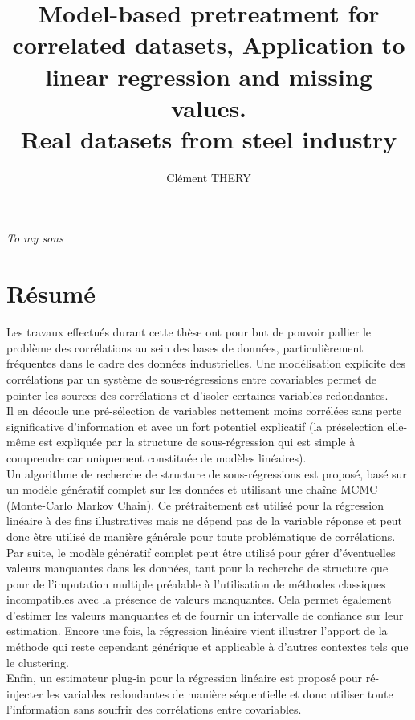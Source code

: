 \documentclass[12pt,a4paper]{report}
\author{Clément THERY}
\title{Model-based pretreatment for correlated datasets, Application to linear regression and missing values. \\ Real datasets from steel industry}
\begin{document}
\maketitle
\newpage
\itshape To my sons
\upshape


\chapter*{Résumé}
	Les travaux effectués durant cette thèse ont pour but de pouvoir pallier le problème des corrélations au sein des bases de données, particulièrement fréquentes dans le cadre des données industrielles. Une modélisation explicite des corrélations par un système de sous-régressions entre covariables permet de pointer les sources des corrélations et d'isoler certaines variables redondantes. 
	\\
	
	Il en découle une pré-sélection de variables nettement moins corrélées sans perte significative d'information et avec un fort potentiel explicatif (la préselection elle-même est expliquée par la structure de sous-régression qui est simple à comprendre car uniquement constituée de modèles linéaires). \\
	
	Un algorithme de recherche de structure de sous-régressions est proposé, basé sur un modèle génératif complet sur les données et utilisant une chaîne MCMC (Monte-Carlo Markov Chain). Ce prétraitement est utilisé pour la régression linéaire à des fins illustratives mais ne dépend pas de la variable réponse et peut donc être utilisé de manière générale pour toute problématique de corrélations.\\
	
	Par suite, le modèle génératif complet peut être utilisé pour gérer d'éventuelles valeurs manquantes dans les données, tant pour la recherche de structure que pour de l'imputation multiple préalable à l'utilisation de méthodes classiques incompatibles avec la présence de valeurs manquantes. Cela permet également d'estimer les valeurs manquantes et de fournir un intervalle de confiance sur leur estimation.
	Encore une fois, la régression linéaire vient illustrer l'apport de la méthode qui reste cependant générique et applicable à d'autres contextes tels que le clustering.
	\\
	
	Enfin, un estimateur plug-in pour la régression linéaire est proposé pour ré-injecter les variables redondantes de manière séquentielle et donc utiliser toute l'information sans souffrir des corrélations entre covariables.
	\\
	
\end{document}
